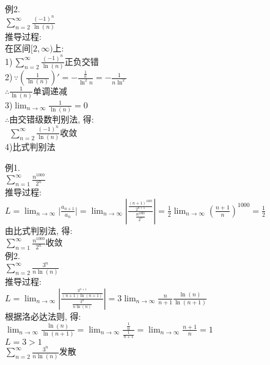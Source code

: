 例2.\\
\phantom{例}$\displaystyle\sum_{n=2}^\infty\frac{(-1)^n}{\ln(n)}$\\
推导过程:\\
在区间$[2,\infty)$上:\\
1)\,$\displaystyle\sum_{n=2}^\infty\frac{(-1)^n}{\ln(n)}$正负交错\\
2)\,$\displaystyle\because(\frac{1}{\ln(n)})'=-\frac{\frac{1}{n}}{\ln^2n}=-\frac{1}{n\ln^2}$\\
\phantom{2)\,}$\displaystyle\therefore\frac{1}{\ln(n)}单调递减$\\
3)$\displaystyle\lim_{n\to\infty}\frac{1}{\ln(n)}=0$\\
$\therefore$由交错级数判别法, 得:\\
$\phantom{\therefore}\displaystyle\sum_{n=2}^\infty\frac{(-1)^n}{\ln(n)}$收敛\\[2ex]

4)比式判别法
{\par\centering
{}
\par}

例1.\\
\phantom{例}$\displaystyle\sum_{n=1}^{\infty}\frac{n^{1000}}{2^n}$\\[1ex]
推导过程:\\
$\displaystyle L=\lim_{n\to\infty}\Big|\frac{a_{n+1}}{a_n}\Big|=\lim_{n\to\infty}\left|\frac{\frac{(n+1)^{1000}}{2^{n+1}}}{\frac{n^{1000}}{2^n}}\right|=\frac{1}{2}\lim_{n\to\infty}(\frac{n+1}{n})^{1000}=\frac{1}{2}$\\
由比式判别法, 得:\\
$\displaystyle\sum_{n=1}^{\infty}\frac{n^{1000}}{2^n}$收敛\\[1ex]

例2.\\
\phantom{例}$\displaystyle\sum_{n=2}^\infty\frac{3^n}{n\ln(n)}$\\
推导过程:\\
$\displaystyle L=\lim_{n\to\infty}\left|\frac{\frac{3^{n+1}}{(n+1)\ln(n+1)}}{\frac{3^n}{n\ln(n)}}\right|=3\lim_{n\to\infty}\frac{n}{n+1}\frac{\ln(n)}{\ln(n+1)}$\\
根据洛必达法则, 得:\\
$\displaystyle\lim_{n\to\infty}\frac{\ln(n)}{\ln(n+1)}=\lim_{n\to\infty}\frac{\frac{1}{n}}{\frac{1}{n+1}}=\lim_{n\to\infty}\frac{n+1}{n}=1$\\
$L=3>1$\\
$\displaystyle\sum_{n=2}^\infty\frac{3^n}{n\ln(n)}$发散\\[1ex]

